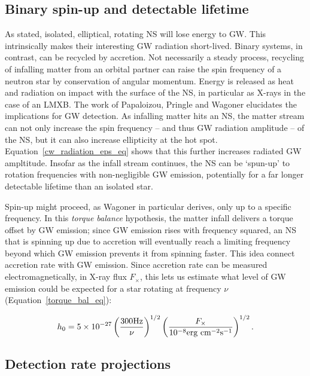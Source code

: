             \subsection{Binary spin-up and detectable lifetime}
            \label{spin-up}
         
As stated, isolated, elliptical, rotating NS will lose energy to GW.
This intrinsically makes their interesting GW radiation short-lived.
Binary systems, in contrast, can be recycled by accretion.
Not necessarily a steady process, recycling of infalling matter from an orbital partner can raise the spin frequency of a neutron star by conservation of angular momentum.
Energy is released as heat and radiation on impact with the surface of the NS, in particular as X-rays in the case of an LMXB.
The work of Papaloizou, Pringle and Wagoner elucidates the implications for GW detection.
As infalling matter hits an NS, the matter stream can not only increase the spin frequency -- and thus GW radiation amplitude -- of the NS, but it can also increase ellipticity at the hot spot.
Equation~\ref{cw_radiation_eps_eq} shows that this further increases radiated GW ampltitude.
Insofar as the infall stream continues, the NS can be `spun-up' to rotation frequencies with non-negligible GW emission, potentially for a far longer detectable lifetime than an isolated star.

Spin-up might proceed, as Wagoner in particular derives, only up to a specific frequency.
In this \textit{torque balance} hypothesis, the matter infall delivers a torque offset by GW emission; since GW emission rises with frequency squared, an NS that is spinning up due to accretion will eventually reach a limiting frequency beyond which GW emission prevents it from spinning faster.
This idea connect accretion rate with GW emission.
Since accretion rate can be measured electromagnetically, in X-ray flux $F_\times$, this lets us estimate what level of GW emission could be expected for a star rotating at frequency $\nu$ (Equation~\ref{torque_bal_eq}): 

\begin{equation}
h_{0}=5\times10^{-27}\left(\frac{300\textup{Hz}}{\nu}\right)^{1/2}\left(\frac{F_{\times}}{10^{-8}\textup{erg cm}^{-2}\textup{s}^{-1}}\right)^{1/2}.
\label{torque_bal_eq}
\end{equation}


            \subsection{Detection rate projections}
            \label{rate_projections}

